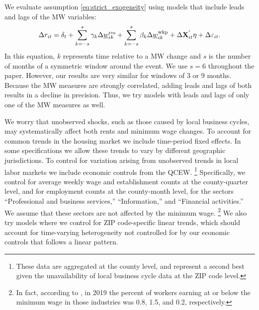 We evaluate assumption \eqref{eq:strict_exogeneity} using models that 
include leads and lags of the MW variables:
\begin{equation} \label{eq:fd_leads_lags}
    \Delta r_{it} = \delta_t
                  + \sum_{k=-s}^{s} \gamma_k \Delta \underline{w}^{\text{res}}_{ik} 
                  + \sum_{k=-s}^{s} \beta_k \Delta \underline{w}^{\text{wkp}}_{ik}
                  + \Delta \mathbf{X}^{'}_{it}\eta
                  + \Delta \varepsilon_{it} .
\end{equation}
In this equation,
$k$ represents time relative to a MW change and 
$s$ is the number of months of a symmetric window around the event.
We use $s=6$ throughout the paper. However, our results are very similar for 
windows of 3 or 9 months.
Because the MW measures are strongly correlated, adding leads and lags of both 
results in a decline in precision.
Thus, we try models with leads and lags of only one of the MW measures as well.

We worry that unobserved shocks, such as those caused by local business cycles, 
may systematically affect both rents and minimum wage changes.
To account for common trends in the housing market we include time-period 
fixed effects.
In some specifications we allow these trends to vary by different geographic 
jurisdictions.
To control for variation arising from unobserved trends in local labor markets 
we include economic controls from the QCEW.%
\footnote{These data are aggregated at the county level, and represent a second 
best given the unavailability of local business cycle data at the ZIP code 
level.}
Specifically, we control for average weekly wage and establishment counts at the 
county-quarter level, and for employment counts at the county-month level, 
for the sectors 
``Professional and business services,'' ``Information,'' and 
``Financial activities.''
We assume that these sectors are not affected by the minimum wage.%
\footnote{In fact, according to \textcite[][Table 5]{MinWorkersReportBLS}, in 
2019 the percent of workers earning at or below the minimum wage in those 
industries was 0.8, 1.5, and 0.2, respectively.}
We also try models where we control for ZIP code-specific linear
trends, which should account for time-varying heterogeneity not controlled for 
by our economic controls that follows a linear pattern.

